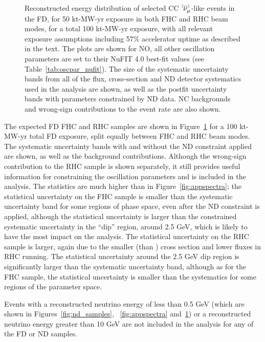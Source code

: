 \begin{figure}[htbp]
  \\
\caption{Reconstructed energy distribution of selected CC $\;\nu^{\bracketbar}_{\mu}$-like events in the FD, for 50 kt-MW-yr exposure in both FHC and RHC beam modes, for a total 100 kt-MW-yr exposure, with all relevant exposure assumptions including 57\% accelerator uptime as described in the text. The plots are shown for NO, all other oscillation parameters are set to their NuFIT 4.0 best-fit values (see Table~\ref{tab:oscpar_nufit}). The size of the systematic uncertainty bands from all of the flux, cross-section and ND detector systematics used in the analysis are shown, as well as the postfit uncertainty bands with parameters constrained by ND data. NC backgrounds and wrong-sign contributions to the event rate are also shown.}
\label{fig:disspectra}
\end{figure}
The expected FD FHC \numu and RHC \anumu samples are shown in Figure~\ref{fig:disspectra} for a 100 kt-MW-yr total FD exposure, split equally between FHC and RHC beam modes. The systematic uncertainty bands with and without the ND constraint applied are shown, as well as the background contributions. Although the wrong-sign \numu contribution to the RHC \anumu sample is shown separately, it still provides useful information for constraining the oscillation parameters and is included in the analysis. The statistics are much higher than in Figure~\ref{fig:appspectra}; the statistical uncertainty on the \numu FHC sample is smaller than the systematic uncertainty band for some regions of phase space, even after the ND constraint is applied, although the statistical uncertainty is larger than the constrained systematic uncertainty in the ``dip'' region, around 2.5 GeV, which is likely to have the most impact on the analysis. The statistical uncertainty on the \anumu RHC sample is larger, again due to the smaller \anumu (than \numu) cross section and lower fluxes in RHC running. The statistical uncertainty around the 2.5 GeV dip region is significantly larger than the systematic uncertainty band, although as for the FHC \numu sample, the statistical uncertainty is smaller than the systematics for some regions of the parameter space.

Events with a reconstructed neutrino energy of less than 0.5 GeV (which are shown in Figures~\ref{fig:nd_samples}, ~\ref{fig:appspectra} and~\ref{fig:disspectra}) or a reconstructed neutrino energy greater than 10 GeV are not included in the analysis for any of the FD or ND samples.



